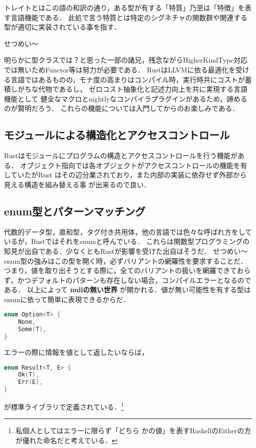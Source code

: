 トレイトとはこの語の和訳の通り，ある型が有する「特質」乃至は「特徴」を表す言語機能である．
此処で言う特質とは特定のシグネチャの関数群や関連する型が適切に実装されている事を指す．

せつめい〜

明らかに型クラスでは？と思った一部の諸兄，残念ながらHigherKindType対応では無いためFunctor等は努力が必要である．
RustはLLVMに依る最適化を受ける言語ではあるものの，モナ度の高まりはコンパイル時，実行時共にコストが蓄積しがちな代物であるし，
ゼロコスト抽象化と記述力向上を共に実現する言語機能として
健全なマクロとnightlyなコンパイラプラグインがあるため，諦めるのが賢明だろう．
これらの機能については入門してからのお楽しみである．

\subsection{モジュールによる構造化とアクセスコントロール}
Rustはモジュールにプログラムの構造とアクセスコントロールを行う機能がある．
オブジェクト指向では各オブジェクトがアクセスコントロールの機能を有していたがRust
はその辺分業されており，また内部の実装に依存せず外部から見える構造を組み替える事
が出来るので良い．


\subsection{enum型とパターンマッチング}
代数的データ型，直和型，タグ付き共用体，他の言語では色々な呼ばれ方をしているが，Rustではそれをenumと呼んでいる．
これらは関数型プログラミングの知見が出自である．少なくともRustが影響を受けた出自はそうだ．
せつめい〜
enum型の強みはこの型を開く時，必ずバリアントの網羅性を要求することだ．
つまり，値を取り出そうとする際に，全てのバリアントの扱いを網羅できておらず，かつデフォルトのパターンも存在しない場合，コンパイルエラーとなるのである．
以上によって \textbf{nullの無い世界} が開かれる．値が無い可能性を有する型はenumに依って簡単に表現できるからだ．
\begin{lstlisting}[language={C++},caption=Option型,label=option_t]
enum Option<T> {
    None,
    Some(T),
}
\end{lstlisting}
エラーの際に情報を値として返したいならば，
\begin{lstlisting}[language={C++},caption=Result型,label=result_t]
enum Result<T, E> {
    Ok(T),
    Err(E),
}
\end{lstlisting}
が標準ライブラリで定義されている．\footnote{私個人としてはエラーに限らず「どちら
  かの値」を表すHaskellのEitherの方が優れた命名だと考えている．}

